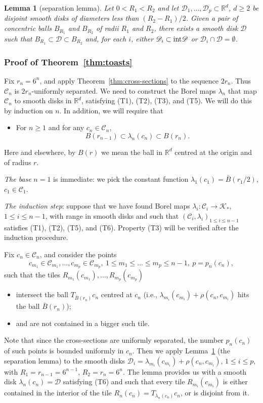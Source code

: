 \documentclass[11pt]{paper}
\newtheorem{lemma}{Lemma}
\newcommand{\bR}{\mathbb R}
\newcommand{\cC}{\mathcal C}
\newcommand{\cK}{\mathcal K}
\newcommand{\la}{\lambda}
\begin{document}
\begin{lemma}[separation lemma]\label{lemma:separation}
  Let $0<R_1<R_2$ and let $\mathscr D_1, \ldots, \mathscr D_p \subset \bR^d$, $d\ge 2$ be disjoint
  smooth disks of diameters less than $(R_2-R_1)/2$. Given a pair of concentric balls $B_{R_1}$ and
  $B_{R_2}$ of radii $R_1$ and $R_2$, there exists a smooth disk $\mathscr D$ such that
  $ B_{R_1} \subset \mathscr D \subset B_{R_2} $ and, for each $i$, either
  $\mathscr D_i \subset {\rm int}\mathscr D$ or $\mathscr D_i \cap \mathscr D = \emptyset$.
\end{lemma}

\subsubsection{Proof of Theorem~\ref{thm:toasts}}
Fix $r_n =6^n$,
and apply Theorem~\ref{thm:cross-sections} to the sequence $2r_n$.
Thus $\cC_n$ is $2r_n$-uniformly separated.
We need to construct the Borel maps $\la_n$ that map $\cC_n$ to smooth disks in $\bR^d$, satisfying
(T1), (T2), (T3), and (T5). We will do this by induction on $n$. In addition, we will require that
\begin{itemize}
\item[(T6)] For $n\ge 1$ and for any $c_n\in\cC_n$,
\[
B(r_{n-1}) \subset \la_n(c_n) \subset B(r_n).
\]
\end{itemize}
Here and elsewhere, by $B(r)$ we mean the ball in $\bR^d$ centred at the origin and of radius $r$.

\medskip
{\em The base} $n=1$ is immediate: we pick the constant function $\la_1(c_1) = \bar B(r_1/2)$,
$c_1\in\cC_1$.

\smallskip
{\em The induction step}: suppose that we have found Borel maps
$\la_i\colon \cC_i \to \cK_*$, $1\le i \le n-1$,
with range in smooth disks and such that $(\cC_i, \la_i)_{1\le i \le n-1}$ satisfies (T1), (T2), (T5),
and (T6).
Property (T3) will be verified after the induction procedure.

Fix $c_n\in\cC_n$, and consider the points
\[
c_{m_1}\in\cC_{m_1}, \ldots , c_{m_p}\in \cC_{m_p}, \
1 \le m_1 \le \ldots \le m_p \le n-1, \ p=p_n(c_n),
\]
such that the tiles $R_{m_1}(c_{m_1}), \ldots , R_{m_p}(c_{m_p})$
\begin{itemize}
\item
intersect the ball $T_{\bar B(r_n)} c_n $ centred at $c_n$
(i.e., $\la_{m_i}(c_{m_i}) + \rho(c_n, c_{m_i})$ hits the ball $\bar B(r_n)$);
\item and are not contained in a bigger such tile.
\end{itemize}
Note that since the cross-sections are uniformly separated, the number $p_n(c_n)$ of such points
is bounded uniformly in $c_n$.  Then we apply Lemma~\ref{lemma:separation} (the separation lemma)
to the smooth disks $\mathscr D_i = \la_{m_i}(c_{m_i}) + \rho(c_n, c_{m_i})$, $1\le i \le p$,
with $R_1 = r_{n-1}=6^{n-1}$,
$R_2 = r_n = 6^n$. The lemma provides us with a smooth disk $\la_n(c_n)=\mathscr D$
satisfying (T6) and such that every tile $R_{m_i}(c_{m_i})$ is either contained in the interior of the tile
$R_n(c_n) = T_{\la_n(c_n)} c_n$, or is disjoint from it.
\end{document}
